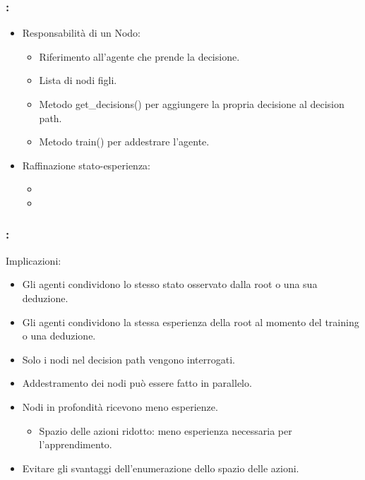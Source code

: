 \documentclass[compress]{beamer}
\begin{document}
\begin{frame}
    \frametitle{\subsecname: \subsubsecname}
    \begin{itemize}
        \item Responsabilità di un Nodo:
        \begin{itemize}
            \item Riferimento all'agente che prende la decisione.
            \item Lista di nodi figli.
            \item Metodo get\_decisions() per aggiungere la propria decisione al decision path.
            \item Metodo train() per addestrare l'agente.
        \end{itemize}
        \item Raffinazione stato-esperienza:
        \begin{itemize}
            \item {}
            \item {}
        \end{itemize}
    \end{itemize}
\end{frame}

\begin{frame}
    \frametitle{\subsecname: \subsubsecname}
    Implicazioni:
    \begin{itemize}
        \item Gli agenti condividono lo stesso stato osservato dalla root o una sua deduzione.
        \item Gli agenti condividono la stessa esperienza della root al momento del training o una deduzione.
        \item Solo i nodi nel decision path vengono interrogati.
        \item Addestramento dei nodi può essere fatto in parallelo.
        \item Nodi in profondità ricevono meno esperienze.
        \begin{itemize}
            \item Spazio delle azioni ridotto: meno esperienza necessaria per l'apprendimento.
        \end{itemize}
        \item Evitare gli svantaggi dell'enumerazione dello spazio delle azioni.
    \end{itemize}
\end{frame}
\end{document}
